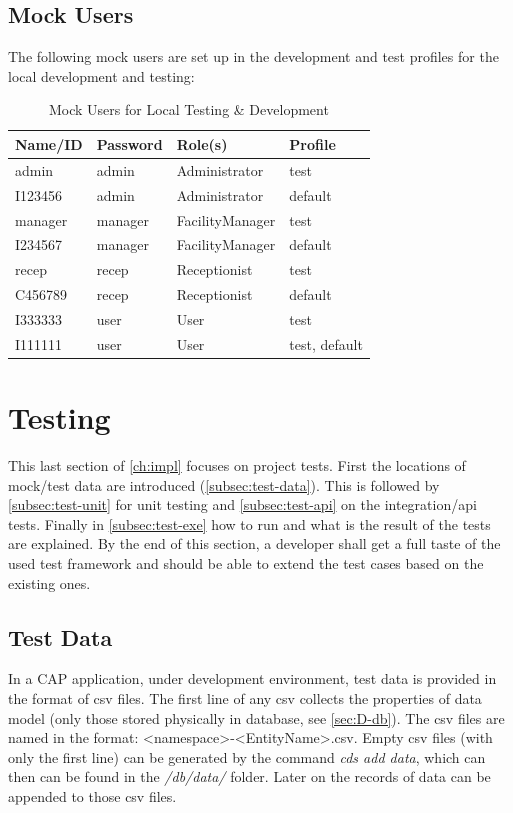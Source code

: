 \subsection{Mock Users}

The following mock users are set up in the development and test profiles for the local development and testing:

\begin{table}[H]
    \centering
    \begin{tabular}{|m{2.5cm}|m{2.5cm}|m{3.5cm}|m{2.5cm}|} \hline 
        \textbf{Name/ID} & \textbf{Password} & \textbf{Role(s)} & \textbf{Profile} \\ \hline 
        admin & admin & Administrator & test \\ \hline 
        I123456 & admin & Administrator & default \\ \hline
        manager & manager & FacilityManager & test \\ \hline 
        I234567 & manager & FacilityManager & default \\ \hline 
        recep & recep & Receptionist & test \\ \hline 
        C456789 & recep & Receptionist & default \\ \hline 
        I333333 & user & User & test \\ \hline
        I111111 & user & User & test, default \\ \hline 
    \end{tabular}
    \caption{Mock Users for Local Testing \& Development}
\end{table}

\section{Testing}
\label{sec:D-testing}

This last section of \autoref{ch:impl} focuses on project tests. First the locations of mock/test data are introduced (\autoref{subsec:test-data}). This is followed by \autoref{subsec:test-unit} for unit testing and \autoref{subsec:test-api} on the integration/api tests. Finally in \autoref{subsec:test-exe} how to run and what is the result of the tests are explained. By the end of this section, a developer shall get a full taste of the used test framework and should be able to extend the test cases based on the existing ones.

\subsection{Test Data}
\label{subsec:test-data}
In a CAP application, under development environment, test data is provided in the format of csv \cite{csv} files. The first line of any csv collects the properties of data model (only those stored physically in database, see \autoref{sec:D-db}). The csv files are named in the format: <namespace>-<EntityName>.csv. Empty csv files (with only the first line) can be generated by the command \textit{cds add data}, which can then can be found in the \textit{/db/data/} folder. Later on the records of data can be appended to those csv files.

